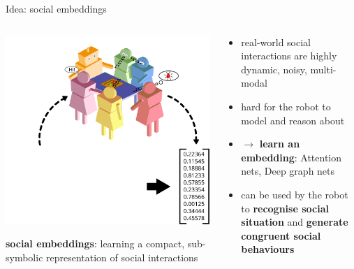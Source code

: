 \documentclass[xcolor=table]{beamer}
\begin{document}
\begin{frame}{Idea: social embeddings}
    \begin{columns}
        \begin{column}{0.5\linewidth}
    \begin{center}
        \includegraphics[width=\linewidth]{social-interactions/social-embeddings}
    \end{center}

        {\scriptsize
        \textbf{social embeddings}: learning a compact, sub-symbolic representation of social interactions
        }
        \end{column}
        \begin{column}{0.5\linewidth}
            \begin{itemize}
                \item real-world social interactions are highly dynamic, noisy,
                    multi-modal
                \item hard for the robot to model and reason about
                \item $\rightarrow$ \textbf{learn an embedding}: Attention nets, Deep
                    graph nets
                \item can be used by the robot to \textbf{recognise social situation} and
                    \textbf{generate congruent social behaviours}
            \end{itemize}
        \end{column}
    \end{columns}
\end{frame}
\end{document}
